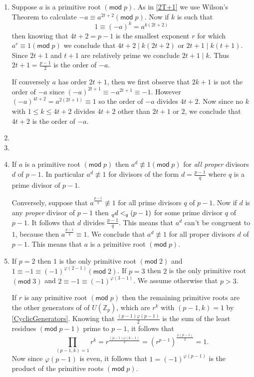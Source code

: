 \documentclass[12pt]{article}
\renewcommand{\pmod}[1]{\left(\mathsf{mod}\;#1\right)}
\let\ord\relax\DeclareMathOperator{\ord}{\mathsf{ord}}
\begin{document}
\begin{enumerate}
\item %
Suppose $a$ is a primitive root $\pmod{p}$. As in \autoref{2T+1}
we use Wilson's Theorem to calculate $-a\equiv a^{2t+2}\pmod{p}$.
Now if $k$ is such that
\[1\equiv\left(-a\right)^k=a^{k\left(2t+2\right)}\]
then knowing that $4t+2=p-1$ is the smallest exponent $r$ for
which $a^r\equiv 1\pmod{p}$ we conclude that
$4t+2\mid k\left(2t+2\right)$ or $2t+1\mid k\left(t+1\right)$.
Since $2t+1$ and $t+1$ are relatively prime we conclude $2t+1\mid k$.
Thus $2t+1=\frac{p-1}{2}$ is the order of $-a$.

If conversely $a$ has order $2t+1$, then we first observe that
$2k+1$ is not the order of $-a$ since $\left(-a\right)^{2t+1}
\equiv -a^{2t+1}\equiv -1$.
However $\left(-a\right)^{4t+2}=a^{2\left(2t+1\right)}\equiv 1$
so the order of $-a$ divides $4t+2$. Now since no
$k$ with $1\le k\le 4t+2$ divides $4t+2$ other than $2t+1$ or $2$,
we conclude that $4t+2$ is the order of $-a$.

\item %
\item %

\item %
If $a$ is a primitive root $\pmod{p}$ then $a^d\not\equiv 1\pmod{p}$
for {\em all proper} divisors $d$ of $p-1$. In particular $a^d\not\equiv 1$
for divisors of the form $d=\frac{p-1}{q}$ where $q$ is a prime divisor
of $p-1$.

Conversely, suppose that $a^{\frac{p-1}{q}}\not\equiv 1$
for all prime divisors
$q$ of $p-1$. Now if $d$ is any {\em proper} divisor of $p-1$ then
$\ord_q{d}<\ord_q\left(p-1\right)$ for some prime divisor $q$ of $p-1$.
It follows that $d$ divides $\frac{p-1}{q}$. This means that $a^d$ can't be
congruent to $1$, because then $a^{\frac{p-1}{q}}\equiv 1$.
We conclude that $a^d\not\equiv 1$ for all proper divisors $d$ of
$p-1$. This means that $a$ is a primitive root $\pmod{p}$.

\item %
If $p=2$ then $1$ is the only primitive root $\pmod{2}$
and $1\equiv -1\equiv\left(-1\right)^{\varphi\left(2-1\right)}
\pmod{2}$.
If $p=3$ then $2$ is the only primitive root $\pmod{3}$
and $2\equiv -1\equiv\left(-1\right)^{\varphi\left(3-1\right)}$.
We assume otherwise that $p>3$.

If $r$ is any primitive root $\pmod{p}$ then the remaining
primitive roots are the other generators of 
of $U\left(\mathbb{Z}_p\right)$,
which are $r^k$ with $\left(p-1,k\right)=1$ by \autoref{CyclicGenerators}.
Knowing that $\frac{\left(p-1\right)\varphi\left(p-1\right)}{2}$
is the sum of the least residues $\pmod{p-1}$
prime to $p-1$, it follows that
\[\prod_{\left(p-1,k\right)=1}r^k
=r^{\frac{\left(p-1\right)\varphi\left(k-1\right)}{2}}
=\left(r^{p-1}\right)^{\frac{\varphi\left(p-1\right)}{2}}=1.\]
Now since $\varphi\left(p-1\right)$ is even, it follows that
$1=\left(-1\right)^{\varphi\left(p-1\right)}$ is the product
of the primitive roots $\pmod{p}$.


\end{enumerate}
\end{document}
